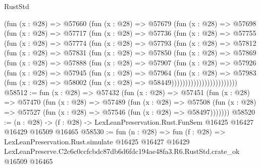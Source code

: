 \begin{lexlean}{RustStd}
\begin{coremodule}
            (fun (x : @28) =>
            @57660
              (fun (x : @28) =>
              @57679
                (fun (x : @28) =>
                @57698
                  (fun (x : @28) =>
                  @57717
                    (fun (x : @28) =>
                    @57736
                      (fun (x : @28) =>
                      @57755
                        (fun (x : @28) =>
                        @57774
                          (fun (x : @28) =>
                          @57793
                            (fun (x : @28) =>
                            @57812
                              (fun (x : @28) =>
                              @57831
                                (fun (x : @28) =>
                                @57850
                                  (fun (x : @28) =>
                                  @57869
                                    (fun (x : @28) =>
                                    @57888
                                      (fun (x : @28) =>
                                      @57907
                                        (fun (x : @28) =>
                                        @57926
                                          (fun (x : @28) =>
                                          @57945
                                            (fun (x : @28) =>
                                            @57964
                                              (fun (x : @28) =>
                                              @57983
                                                (fun (x : @28) =>
                                                @58002
                                                  (fun (x : @28) => @58449))))))))))))))))))))))))
@58512 := fun (x : @28) =>
  @57432
    (fun (x : @28) =>
    @57451
      (fun (x : @28) =>
      @57470
        (fun (x : @28) =>
        @57489
          (fun (x : @28) =>
          @57508 (fun (x : @28) => @57527 (fun (x : @28) => @57546 (fun (x : @28) => @58497)))))))
@58520 := (n : @28) ->
  (f : @28) -> LexLeanPreservation.Rust.FunSem @16425 @16427 @16429 @16509 @16465
@58530 := fun (n : @28) =>
  fun (f : @28) =>
  LexLeanPreservation.Rust.simulate
    @16425
    @16427
    @16429
    LexLeanPreserve.C2c6c0ccfcbdc87db6d6fdc194ae48fa3.R6.RustStd.crate_ok
    @16509
    @16465
\end{coremodule}
\end{lexlean}

